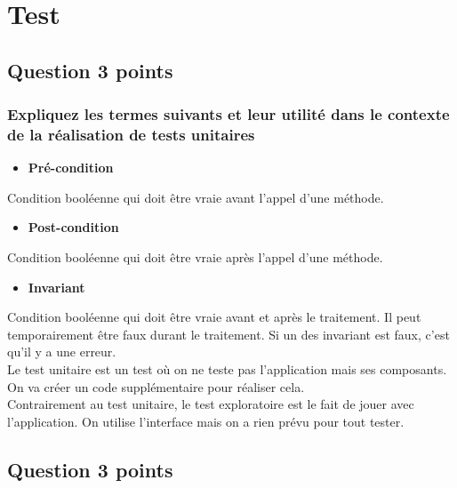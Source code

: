 \section{Test}



\subsection{Question 3 points}



\subsubsection{Expliquez les termes suivants et leur utilité dans le contexte de la réalisation de tests unitaires}

\begin{itemize}
    \item \textbf{Pré-condition}
\end{itemize}
\textcolor[rgb]{0,0.48,0.58}{Condition booléenne qui doit être vraie avant l'appel d'une méthode.}

\begin{itemize}
	\item \textbf{Post-condition}
\end{itemize}
\textcolor[rgb]{0,0.48,0.58}{Condition booléenne qui doit être vraie après l'appel d'une méthode.}

\begin{itemize}
	\item \textbf{Invariant}
\end{itemize}
\color[rgb]{0,0.48,0.58}
Condition booléenne qui doit être vraie avant et après le traitement. Il peut temporairement être faux durant le traitement. Si un des invariant est faux, c'est qu'il y a une erreur.
\\Le test unitaire est un test où on ne teste pas l'application mais ses composants. On va créer un code supplémentaire pour réaliser cela.
\\Contrairement au test unitaire, le test exploratoire est le fait de jouer avec l'application. On utilise l'interface mais on a rien prévu pour tout tester.
\color[rgb]{0,0,0}



\subsection{Question 3 points}



